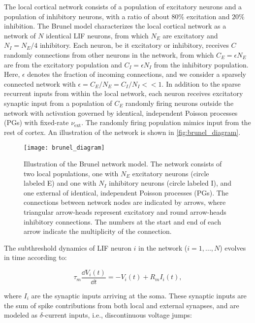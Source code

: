 The local cortical network consists of a population of excitatory neurons and a population of inhibitory neurons, with a ratio of about $80\%$ excitation and $20\%$ inhibition. The Brunel model characterizes the local cortical network as a network of $N$ identical LIF neurons, from which $N_E$ are excitatory and $N_I = N_E / 4$ inhibitory. Each neuron, be it excitatory or inhibitory, receives $C$ randomly connections from other neurons in the network, from which $C_E = \epsilon N_E$ are from the excitatory population and $C_I = \epsilon N_I$ from the inhibitory population. Here, $\epsilon$ denotes the fraction of incoming connections, and we consider a sparsely connected network with $\epsilon = C_E / N_E = C_I / N_I << 1$. In addition to the sparse recurrent inputs from within the local network, each neuron receives excitatory synaptic input from a population of $C_E$ randomly firing neurons outside the network with activation governed by identical, independent Poisson processes (PGs) with fixed-rate $\nu_\mathrm{ext}$. The randomly firing population mimics input from the rest of cortex. An illustration of the network is shown in \autoref{fig:brunel_diagram}.

\begin{figure}[!htb]
    \centering
    \texttt{[image: brunel\_diagram]}
    \caption{Illustration of the Brunel network model. The network consists of two local populations, one with $N_E$ excitatory neurons (circle labeled E) and one with $N_I$ inhibitory neurons (circle labeled I), and one external of identical, independent Poisson processes (PGs). The connections between network nodes are indicated by arrows, where triangular arrow-heads represent excitatory and round arrow-heads inhibitory connections. The numbers at the start and end of each arrow indicate the multiplicity of the connection.
    }
    \label{fig:brunel_diagram}
\end{figure}

The subthreshold dynamics of LIF neuron $i$ in the network ($i=1, ..., N$) evolves in time according to:

\begin{equation}
    \tau_m \frac{\dd{V_i (t)}}{\dd{t}} = - V_i(t) + R_m I_i(t),
\end{equation}

where $I_i$ are the synaptic inputs arriving at the soma. These synaptic inputs are the sum of spike contributions from both local and external synapses, and are modeled as $\delta$-current inputs, i.e., discontinuous voltage jumps: 

